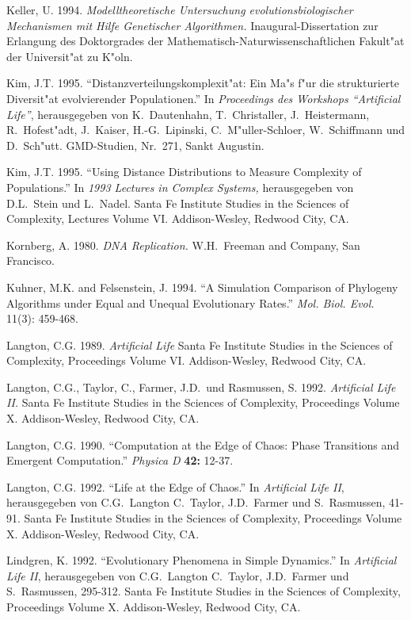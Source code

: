\begin{thebibliography}{99}
Keller, U. 1994. \textsl{Modelltheoretische Untersuchung evolutionsbiologischer Mechanismen
mit Hilfe Genetischer Algorithmen.} Inaugural-Dissertation zur Erlangung des
Doktorgrades der Mathematisch-Naturwissenschaftlichen Fakult"at der Universit"at
zu K"oln.

Kim, J.T. 1995. "`Distanzverteilungskomplexit"at: Ein Ma"s f"ur die strukturierte Diversit"at
evolvierender Populationen."' In \textsl{Proceedings des Workshops "`Artificial Life"'},
herausgegeben von K.\ Dautenhahn, T.\ Christaller, J.\ Heistermann, R.\ Hofest"adt, J.\ Kaiser,
H.-G.\ Lipinski, C.\ M"uller-Schloer, W.\ Schiffmann und D.\ Sch"utt. GMD-Studien, Nr.\ 271, Sankt Augustin.

Kim, J.T. 1995. "`Using Distance Distributions to Measure Complexity of Populations."'
In \textsl{1993 Lectures in Complex Systems,} herausgegeben von D.L.\ Stein und L.\ Nadel.
Santa Fe Institute Studies in the Sciences of Complexity, Lectures Volume VI.
Addison-Wesley, Redwood City, CA.

Kornberg, A. 1980. \textsl{DNA Replication.} W.H.\ Freeman and Company, San Francisco.

Kuhner, M.K. and Felsenstein, J. 1994. "`A Simulation Comparison of Phylogeny Algorithms
under Equal and Unequal Evolutionary Rates."' \textsl{Mol. Biol. Evol.} 11(3): 459-468.

Langton, C.G. 1989. \textsl{Artificial Life}
Santa Fe Institute Studies in the Sciences of 
Complexity, Proceedings Volume VI. Addison-Wesley, Redwood City, CA.

Langton, C.G., Taylor, C., Farmer, J.D.\ und Rasmussen, S. 1992.
\textsl{Artificial Life II.} Santa Fe
Institute Studies in the Sciences of Complexity, Proceedings Volume X.
Addison-Wesley, Redwood City, CA.

Langton, C.G. 1990. "`Computation at the Edge of Chaos: Phase Transitions and Emergent Computation."'
\textsl{Physica D} \textbf{42:} 12-37.

Langton, C.G. 1992. "`Life at the Edge of Chaos."'
In \textsl{Artificial Life II}, herausgegeben von C.G.\ Langton 
C.\ Taylor, J.D.\ Farmer und S.\ Rasmussen, 41-91. Santa Fe
Institute Studies in the Sciences of Complexity, Proceedings Volume X.
Addison-Wesley, Redwood City, CA.

Lindgren, K. 1992. "`Evolutionary Phenomena in Simple Dynamics."'
In \textsl{Artificial Life II}, herausgegeben von C.G.\ Langton 
C.\ Taylor, J.D.\ Farmer und S.\ Rasmussen, 295-312. Santa Fe
Institute Studies in the Sciences of Complexity, Proceedings Volume X.
Addison-Wesley, Redwood City, CA.


\end{thebibliography}
